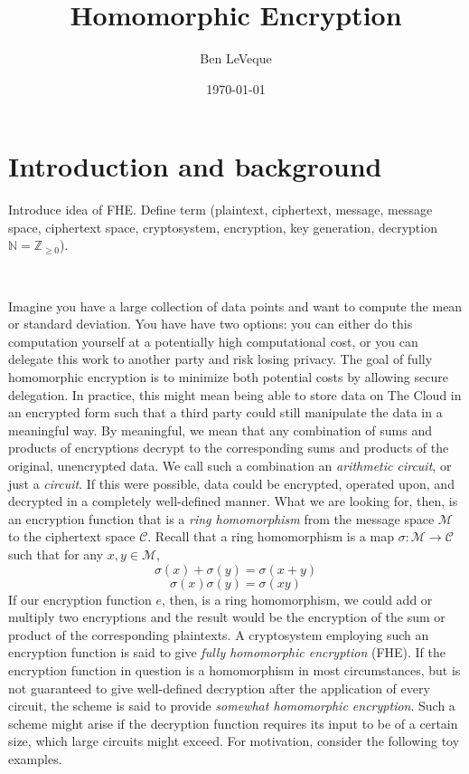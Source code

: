 \documentclass[11pt]{report}
\title{Homomorphic Encryption}
\author{Ben LeVeque}
\date{\today}
\newcommand{\Z}{\mathbb{Z}}
\newcommand{\N}{\mathbb{N}}
\newcommand{\M}{\mathcal{M}}
\begin{document}
\maketitle


\tableofcontents

\newpage

\section[Intro]{Introduction and background}

Introduce idea of FHE. Define term (plaintext, ciphertext, message, message space, ciphertext space, cryptosystem, encryption, key generation, decryption $\N=\Z_{\geq 0}$).

\

Imagine you have a large collection of data points and want to compute the mean or standard deviation. You have have two options: you can either do this computation yourself at a potentially high computational cost, or you can delegate this work to another party and risk losing privacy.  The goal of fully homomorphic encryption is to minimize both potential costs by allowing secure delegation. In practice, this might mean being able to store data on The Cloud in an encrypted form such that a third party could still manipulate the data in a meaningful way. By meaningful, we mean that any combination of sums and products of encryptions decrypt to the corresponding sums and products of the original, unencrypted data. We call such a combination an \emph{arithmetic circuit}, or just a \emph{circuit}. If this were possible, data could be encrypted, operated upon, and decrypted in a completely well-defined manner. What we are looking for, then, is an encryption function that is a \emph{ring homomorphism} from the message space $\M$ to the ciphertext space $\mathcal{C}$. Recall that a ring homomorphism is a map $\sigma: \M \rightarrow \mathcal{C}$ such that for any $x,y\in \M$, \[\sigma(x)+\sigma(y) = \sigma(x+y)\] \[\sigma(x) \sigma(y) = \sigma(xy)\] If our encryption function $e$, then, is a ring homomorphism, we could add or multiply two encryptions and the result would be the encryption of the sum or product of the corresponding plaintexts. A cryptosystem employing such an encryption function is said to give \emph{fully homomorphic encryption} (FHE). If the encryption function in question is a homomorphism in most circumstances, but is not guaranteed to give well-defined decryption after the application of every circuit, the scheme is said to provide \emph{somewhat homomorphic encryption}. Such a scheme might arise if the decryption function requires its input to be of a certain size, which large circuits might exceed. For motivation, consider the following toy examples.
\end{document}
